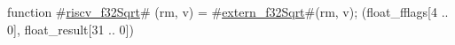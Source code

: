 function #\hyperref[sailRISCVzriscvzyf32Sqrt]{riscv\_f32Sqrt}# (rm, v) = {
  #\hyperref[sailRISCVzexternzyf32Sqrt]{extern\_f32Sqrt}#(rm, v);
  (float_fflags[4 .. 0], float_result[31 .. 0])
}
